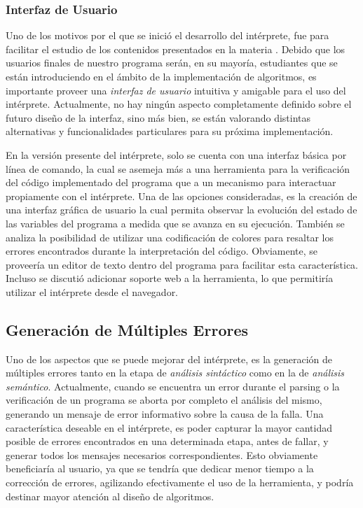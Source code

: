 \subsubsection{Interfaz de Usuario}

Uno de los motivos por el que se inició el desarrollo del intérprete, fue para facilitar el estudio de los contenidos presentados en la materia \Materia{}.
Debido que los usuarios finales de nuestro programa serán, en su mayoría, estudiantes que se están introduciendo en el ámbito de la implementación de algoritmos, es importante proveer una \textit{interfaz de usuario} intuitiva y amigable para el uso del intérprete.
Actualmente, no hay ningún aspecto completamente definido sobre el futuro diseño de la interfaz, sino más bien, se están valorando distintas alternativas y funcionalidades particulares para su próxima implementación.

En la versión presente del intérprete, solo se cuenta con una interfaz básica por línea de comando, la cual se asemeja más a una herramienta para la verificación del código implementado del programa que a un mecanismo para interactuar propiamente con el intérprete.
Una de las opciones consideradas, es la creación de una interfaz gráfica de usuario la cual permita observar la evolución del estado de las variables del programa a medida que se avanza en su ejecución.
También se analiza la posibilidad de utilizar una codificación de colores para resaltar los errores encontrados durante la interpretación del código.
Obviamente, se proveería un editor de texto dentro del programa para facilitar esta característica.
Incluso se discutió adicionar soporte web a la herramienta, lo que permitiría utilizar el intérprete desde el navegador.

\subsection{Generación de Múltiples Errores}

Uno de los aspectos que se puede mejorar del intérprete, es la generación de múltiples errores tanto en la etapa de \textit{análisis sintáctico} como en la de \textit{análisis semántico}.
Actualmente, cuando se encuentra un error durante el parsing o la verificación de un programa se aborta por completo el análisis del mismo, generando un mensaje de error informativo sobre la causa de la falla.
Una característica deseable en el intérprete, es poder capturar la mayor cantidad posible de errores encontrados en una determinada etapa, antes de fallar, y generar todos los mensajes necesarios correspondientes.
Esto obviamente beneficiaría al usuario, ya que se tendría que dedicar menor tiempo a la corrección de errores, agilizando efectivamente el uso de la herramienta, y podría destinar mayor atención al diseño de algoritmos.

